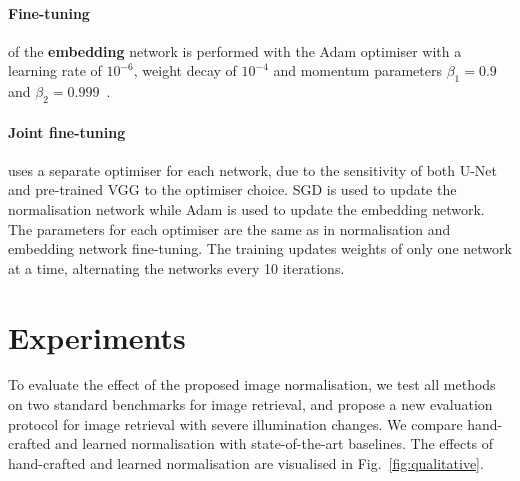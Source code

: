 \paragraph{Fine-tuning} of the {\bf embedding} network is performed with the Adam optimiser with a learning rate of $10^{-6}$, weight decay of $10^{-4}$ and momentum parameters $\beta_1 = 0.9$ and $\beta_2 = 0.999$~\cite{Radenovic-TPAMI18}.

\paragraph{Joint fine-tuning} uses a separate optimiser for each network, due to the sensitivity of both U-Net and pre-trained VGG to the optimiser choice. SGD is used to update the normalisation network while Adam is used to update the embedding network. The parameters for each optimiser are the same as in normalisation and embedding network fine-tuning. The training updates weights of only one network at a time, alternating the networks every 10 iterations.


\section{Experiments} \label{sec:experiments}

To evaluate the effect of the proposed image normalisation, we test all methods on two standard benchmarks for image retrieval, and propose a new evaluation protocol for image retrieval with severe illumination changes. We compare hand-crafted and learned normalisation with state-of-the-art baselines. The effects of hand-crafted and learned normalisation are visualised in Fig.~\ref{fig:qualitative}.

